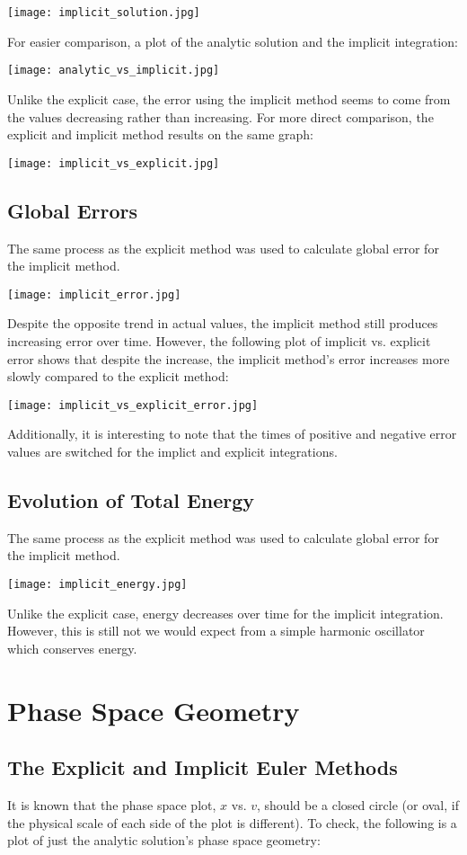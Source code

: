 \documentclass{article}
\begin{document}
\texttt{[image: implicit\_solution.jpg]}

For easier comparison, a plot of the analytic solution and the implicit integration:

\texttt{[image: analytic\_vs\_implicit.jpg]}

Unlike the explicit case, the error using the implicit method seems to come from the values decreasing rather than increasing. For more direct comparison, the explicit and implicit method results on the same graph:

\texttt{[image: implicit\_vs\_explicit.jpg]}

\subsection{Global Errors}
The same process as the explicit method was used to calculate global error for the implicit method.

\texttt{[image: implicit\_error.jpg]}

Despite the opposite trend in actual values, the implicit method still produces increasing error over time. However, the following plot of implicit vs. explicit error shows that despite the increase, the implicit method's error increases more slowly compared to the explicit method:

\texttt{[image: implicit\_vs\_explicit\_error.jpg]}

Additionally, it is interesting to note that the times of positive and negative error values are switched for the implict and explicit integrations.

\subsection{Evolution of Total Energy}
The same process as the explicit method was used to calculate global error for the implicit method.

\texttt{[image: implicit\_energy.jpg]}

Unlike the explicit case, energy decreases over time for the implicit integration. However, this is still not we would expect from a simple harmonic oscillator which conserves energy.

\section{Phase Space Geometry}
\subsection{The Explicit and Implicit Euler Methods}
It is known that the phase space plot, $x$ vs. $v$, should be a closed circle (or oval, if the physical scale of each side of the plot is different). To check, the following is a plot of just the analytic solution's phase space geometry:
\end{document}
